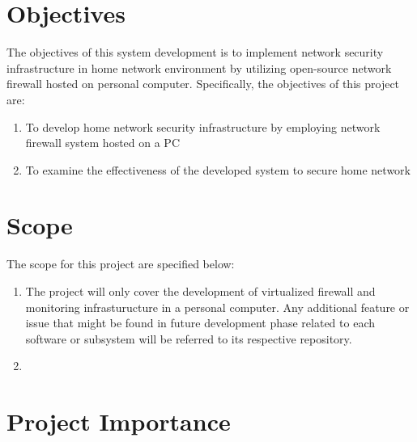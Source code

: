 \documentclass[../index.tex]{subfiles}
\begin{document}
\section{Objectives}

The objectives of this system development is to implement network security infrastructure in home
network environment by utilizing open-source network firewall hosted on personal computer.
Specifically, the objectives of this project are:

\begin{enumerate}

  \item To develop home network security infrastructure by employing network firewall system hosted
    on a PC

  \item To examine the effectiveness of the developed system to secure home network

\end{enumerate}

\section{Scope}

The scope for this project are specified below:

\begin{enumerate}

  \item The project will only cover the development of virtualized firewall and monitoring
    infrasturucture in a personal computer. Any additional feature or issue that might be found in
    future development phase related to each software or subsystem will be referred to its
    respective repository.

  
  \item 

\end{enumerate}

\section{Project Importance}
\end{document}
